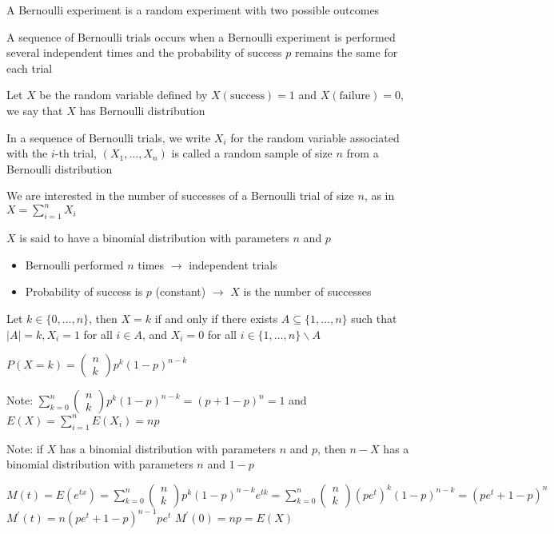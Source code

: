 \documentclass{article}
\begin{document}
A Bernoulli experiment is a random experiment with two possible outcomes

A sequence of Bernoulli trials occurs when a Bernoulli experiment is performed several independent times and the probability of success $p$ remains the same for each trial

Let $X$ be the random variable defined by $X(\text{success})=1$ and $X(\text{failure})=0$, we say that $X$ has Bernoulli distribution

In a sequence of Bernoulli trials, we write $X_i$ for the random variable associated with the $i$-th trial, $(X_1,\dots,X_n)$ is called a random sample of size $n$ from a Bernoulli distribution

We are interested in the number of successes of a Bernoulli trial of size $n$, as in $X=\sum_{i=1}^nX_i$

$X$ is said to have a binomial distribution with parameters $n$ and $p$
\begin{itemize}
    \item Bernoulli performed $n$ times $\rightarrow$ independent trials
    \item Probability of success is $p$ (constant) $\rightarrow$ $X$ is the number of successes
\end{itemize}

Let $k\in\{0,\dots,n\}$, then $X=k$ if and only if there exists  $A\subseteq\{1,\dots,n\}$ such that $\lvert A\rvert=k,X_i=1$ for all $i\in A$, and $X_i=0$ for all $i\in\{1,\dots,n\}\backslash A$

$P(X=k)=\begin{pmatrix}
    n\\k
\end{pmatrix}p^k(1-p)^{n-k}$

Note: $\sum_{k=0}^n\begin{pmatrix}
    n\\k
\end{pmatrix}p^k(1-p)^{n-k}=(p+1-p)^n=1$ and $E(X)=\sum_{i=1}^nE(X_i)=np$

Note: if $X$ has a binomial distribution with parameters $n$ and $p$, then $n-X$ has a binomial distribution with parameters $n$ and $1-p$

$M(t)=E(e^{tx})=\sum_{k=0}^n\begin{pmatrix}
    n\\k
\end{pmatrix}p^k(1-p)^{n-k}e^{tk}=\sum_{k=0}^n\begin{pmatrix}
    n\\k
\end{pmatrix}(pe^t)^k(1-p)^{n-k}=(pe^t+1-p)^n$
$M^\prime(t)=n(pe^t+1-p)^{n-1}pe^t$
$M^\prime(0)=np=E(X)$
\end{document}
